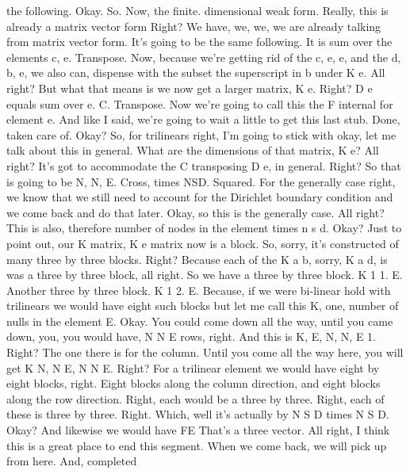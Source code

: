 \documentclass[10pt]{article}
\begin{document}
the following. Okay. So. Now, the finite. dimensional weak form. Really, this is already a matrix vector form Right? We have, we, we, we are already talking from matrix vector form. It's going to be the same following. It is sum over the elements c, e. Transpose. Now, because we're getting rid of the c, e, e, and the d, b, e, we also can, dispense with the subset the superscript in b under K e. All right? But what that means is we now get a larger matrix, K e. Right? D e equals sum over e. C. Transpose. Now we're going to call this the F internal for element e. And like I said, we're going to wait a little to get this last stub. Done, taken care of. Okay? So, for trilinears right, I'm going to stick with okay, let me talk about this in general. What are the dimensions of that matrix, K e? All right? It's got to accommodate the C transposing D e, in general. Right? So that is going to be N, N, E. Cross, times NSD. Squared. For the generally case right, we know that we still need to account for the Dirichlet boundary condition and we come back and do that later. Okay, so this is the generally case. All right? This is also, therefore number of nodes in the element times n s d. Okay? Just to point out, our K matrix, K e matrix now is a block. So, sorry, it's constructed of many three by three blocks. Right? Because each of the K a b, sorry, K a d, is was a three by three block, all right. So we have a three by three block. K 1 1. E. Another three by three block. K 1 2. E. Because, if we were bi-linear hold with trilinears we would have eight such blocks but let me call this K, one, number of nulls in the element E. Okay. You could come down all the way, until you came down, you, you would have, N N E rows, right. And this is K, E, N, N, E 1. Right? The one there is for the column. Until you come all the way here, you will get K N, N E, N N E. Right? For a trilinear element we would have eight by eight blocks, right. Eight blocks along the column direction, and eight blocks along the row direction. Right, each would be a three by three. Right, each of these is three by three. Right. Which, well it's actually by N S D times N S D. Okay? And likewise we would have FE That's a three vector. All right, I think this is a great place to end this segment. When we come back, we will pick up from here. And, completed
\end{document}
